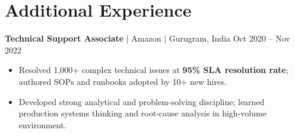 \documentclass[11pt,a4paper]{article}
\begin{document}
\section{Additional Experience}

\textbf{Technical Support Associate} $|$ Amazon $|$ Gurugram, India \hfill Oct 2020 -- Nov 2022
\begin{itemize}
    \item Resolved 1,000+ complex technical issues at \textbf{95\% SLA resolution rate}; authored SOPs and runbooks adopted by 10+ new hires.
    \item Developed strong analytical and problem-solving discipline; learned production systems thinking and root-cause analysis in high-volume environment.
\end{itemize}
\end{document}

